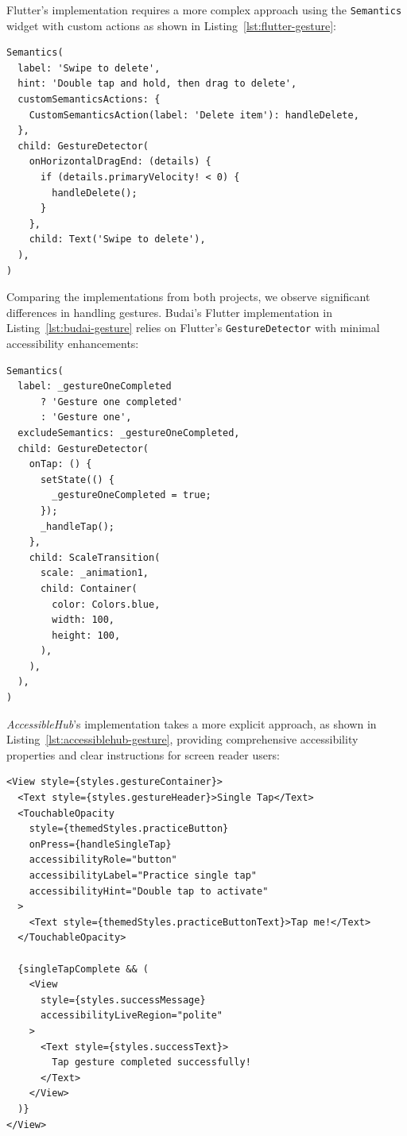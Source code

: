 \pagebreak

Flutter's implementation requires a more complex approach using the \texttt{Semantics} widget with custom actions as shown in Listing~\ref{lst:flutter-gesture}:

\begin{lstlisting}[style=DartStyle, caption=Accessible gesture handler in Flutter, label=lst:flutter-gesture]
Semantics(
  label: 'Swipe to delete',
  hint: 'Double tap and hold, then drag to delete',
  customSemanticsActions: {
    CustomSemanticsAction(label: 'Delete item'): handleDelete,
  },
  child: GestureDetector(
    onHorizontalDragEnd: (details) {
      if (details.primaryVelocity! < 0) {
        handleDelete();
      }
    },
    child: Text('Swipe to delete'),
  ),
)
\end{lstlisting}

Comparing the implementations from both projects, we observe significant differences in handling gestures. Budai's Flutter implementation in Listing~\ref{lst:budai-gesture} relies on Flutter's \texttt{GestureDetector} with minimal accessibility enhancements:

\begin{lstlisting}[style=DartStyle, caption=Gesture handling in Budai's Flutter implementation, label=lst:budai-gesture]
Semantics(
  label: _gestureOneCompleted 
      ? 'Gesture one completed' 
      : 'Gesture one',
  excludeSemantics: _gestureOneCompleted,
  child: GestureDetector(
    onTap: () {
      setState(() {
        _gestureOneCompleted = true;
      });
      _handleTap();
    },
    child: ScaleTransition(
      scale: _animation1,
      child: Container(
        color: Colors.blue,
        width: 100,
        height: 100,
      ),
    ),
  ),
)
\end{lstlisting}

\pagebreak

\textit{AccessibleHub}'s implementation takes a more explicit approach, as shown in Listing~\ref{lst:accessiblehub-gesture}, providing comprehensive accessibility properties and clear instructions for screen reader users:

\begin{lstlisting}[style=ReactNativeStyle, caption=Gesture handling in AccessibleHub's React Native implementation, label=lst:accessiblehub-gesture]
<View style={styles.gestureContainer}>
  <Text style={styles.gestureHeader}>Single Tap</Text>
  <TouchableOpacity
    style={themedStyles.practiceButton}
    onPress={handleSingleTap}
    accessibilityRole="button"
    accessibilityLabel="Practice single tap"
    accessibilityHint="Double tap to activate"
  >
    <Text style={themedStyles.practiceButtonText}>Tap me!</Text>
  </TouchableOpacity>
  
  {singleTapComplete && (
    <View 
      style={styles.successMessage} 
      accessibilityLiveRegion="polite"
    >
      <Text style={styles.successText}>
        Tap gesture completed successfully!
      </Text>
    </View>
  )}
</View>
\end{lstlisting}

